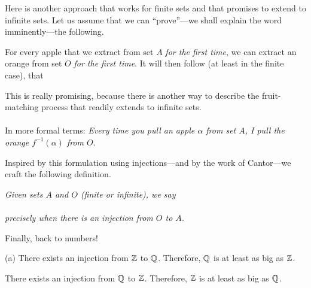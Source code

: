 \medskip

Here is another approach that works for finite sets and that promises
to extend to infinite sets.  Let us assume that we can ``prove''---we
shall explain the word imminently---the following.

For every apple that we extract from set $A$ {\em for the first time},
we can extract an orange from set $O$ {\em for the first time}.  It
will then follow (at least in the finite case), that \\
\hspace*{.35in}{\em There are at least as many oranges as apples!}

\noindent
This is really promising, because there is another way to describe the
fruit-matching process that readily extends to infinite sets.  \\
 \\
In more formal terms: {\em Every time you pull an apple $\alpha$ from set
  $A$, I pull the orange $f^{-1}(\alpha)$ from $O$.}

\medskip

Inspired by this formulation using injections---and by the work of
Cantor---we craft the following definition.

\noindent
{\em
Given sets $A$ and $O$ (finite or infinite), we say \\
\hspace*{.35in}{\em Set $O$ is at least as big as set $A$} \\
precisely when there is an injection from $O$ to $A$.}

\medskip

Finally, back to numbers!


\begin{prop}
\label{thm:|Q|=|Z|}
{\rm (a)} There exists an injection from $\mathbb{Z}$ to $\mathbb{Q}$.  Therefore,
$\mathbb{Q}$ is at least as big as $\mathbb{Z}$.

 There exists an injection from $\mathbb{Q}$ to $\mathbb{Z}$.
Therefore, $\mathbb{Z}$ is at least as big as $\mathbb{Q}$.
\end{prop}

